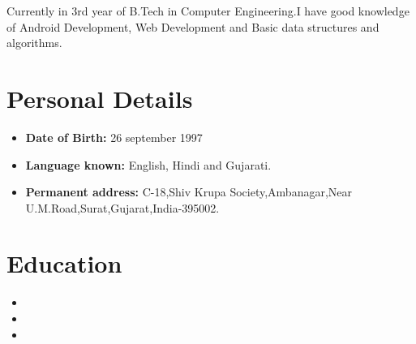 \documentclass[11pt,a4paper,sans]{moderncv}        %
\begin{document}
\makecvtitle

\small{Currently in 3rd year of B.Tech in Computer Engineering.I have good knowledge of Android Development, Web Development and Basic data structures and algorithms. }


\section{Personal Details}
\vspace{6pt}
\begin{itemize}
\item \textbf{Date of Birth: }26 september 1997\vspace{4pt}
\item \textbf{Language known: }English, Hindi and Gujarati\vspace{4pt}.
\item \textbf{Permanent address: }C-18,Shiv Krupa Society,Ambanagar,Near U.M.Road,Surat,Gujarat,India-395002.\vspace{6pt}
\end{itemize}



\section{Education}
\vspace{6pt}
\begin{itemize}
\item{}
\vspace{6pt}
\item{}
\vspace{6pt}
\item{}
\end{itemize}
\end{document}
